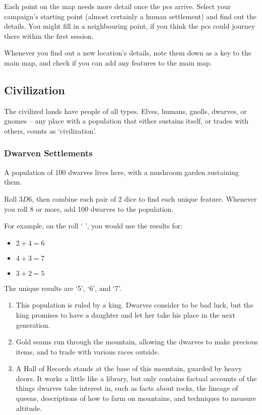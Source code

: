 \begin{multicols}{2}

\noindent
Each point on the map needs more detail once the \glspl{pc} arrive.
Select your campaign's starting point (almost certainly a human settlement) and find out the details.
You might fill in a neighbouring point, if you think the \glspl{pc} could journey there within the first session.

Whenever you find out a new location's details, note them down as a key to the main map, and check if you can add any features to the main map.

\subsection{Civilization}

The civilized lands have people of all types.
Elves, humans, gnolls, dwarves, or gnomes -- any place with a population that either sustains itself, or trades with others, counts as `civilization'.

\subsubsection{Dwarven Settlements}
\label{dwarvesPoint}

A population of 100 dwarves lives here, with a mushroom garden sustaining them.

Roll $3D6$, then combine each pair of 2 dice to find each unique feature.
Whenever you roll 8 or more, add 100 dwarves to the population.

\begin{exampletext}
  For example, on the roll `  ', you would use the results for:

  \begin{itemize}
    \item
    $2+4 = 6$
    \item
    $4+3 = 7$
    \item
    $3+2 = 5$
  \end{itemize}

  The unique results are `5', `6', and `7'.

\end{exampletext}

\begin{enumerate}
  \item
  This population is ruled by a king.
  Dwarves consider to be bad luck, but the king promises to have a daughter and let her take his place in the next generation.
  \item
  Gold seams run through the mountain, allowing the dwarves to make precious items, and to trade with various races outside.
  \item
  A Hall of Records stands at the base of this mountain, guarded by heavy doors.
  It works a little like a library, but only contains factual accounts of the things dwarves take interest in, such as facts about rocks, the lineage of queens, descriptions of how to farm on mountains, and techniques to measure altitude.


\end{enumerate}
\end{multicols}
